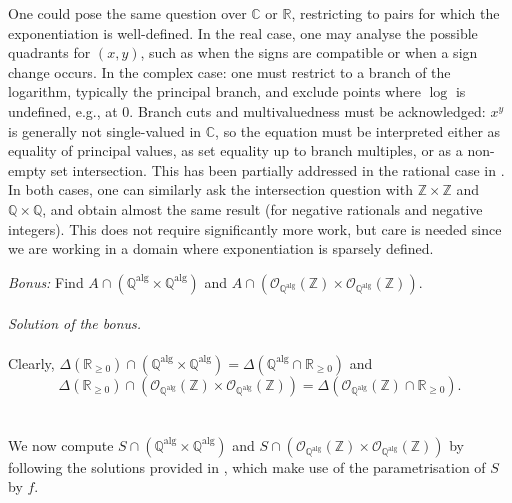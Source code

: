 \begin{solution}
    \begin{remark}
        One could pose the same question over \( \mathbb{C} \) or \( \mathbb{R} \), restricting to pairs for which the exponentiation is well-defined. In the real case, one may analyse the possible quadrants for \( \left(x,y\right) \), such as when the signs are compatible or when a sign change occurs. In the complex case: one must restrict to a branch of the logarithm, typically the principal branch, and exclude points where \( \log \) is undefined, e.g., at \( 0 \). Branch cuts and multivaluedness must be acknowledged: \( x^y \) is generally not single-valued in \( \mathbb{C} \), so the equation must be interpreted either as equality of principal values, as set equality up to branch multiples, or as a non-empty set intersection. This has been partially addressed in the rational case in \cite{solomon1967Hurwitz}. In both cases, one can similarly ask the intersection question with \( \mathbb{Z} \times \mathbb{Z} \) and \( \mathbb{Q} \times \mathbb{Q} \), and obtain almost the same result (for negative rationals and negative integers). This does not require significantly more work, but care is needed since we are working in a domain where exponentiation is sparsely defined.
    \end{remark}
    \noindent\textit{Bonus:}
    Find \( A \cap \left( \mathbb{Q}^{\mathrm{alg}} \times \mathbb{Q}^{\mathrm{alg}} \right) \) and \( A \cap \left( \mathcal{O}_{\mathbb{Q}^{\mathrm{alg}}}\left(\mathbb{Z}\right) \times \mathcal{O}_{\mathbb{Q}^{\mathrm{alg}}}\left(\mathbb{Z}\right) \right) \).
    \\\\
    \textit{Solution of the bonus.}
    \\\\
    Clearly, \( \Delta\left( \mathbb{R}_{\geq 0} \right) \cap \left( \mathbb{Q}^{\mathrm{alg}} \times \mathbb{Q}^{\mathrm{alg}} \right) = \Delta\left( \mathbb{Q}^{\mathrm{alg}} \cap \mathbb{R}_{\geq 0} \right) \) and
    \[
        \Delta\left( \mathbb{R}_{\geq 0} \right) \cap \left( \mathcal{O}_{\mathbb{Q}^{\mathrm{alg}}}\left(\mathbb{Z}\right) \times \mathcal{O}_{\mathbb{Q}^{\mathrm{alg}}}\left(\mathbb{Z}\right) \right) = \Delta\left( \mathcal{O}_{\mathbb{Q}^{\mathrm{alg}}}\left(\mathbb{Z}\right) \cap \mathbb{R}_{\geq 0} \right).
    \]
    \\\\
    We now compute \( S \cap \left( \mathbb{Q}^{\mathrm{alg}} \times \mathbb{Q}^{\mathrm{alg}} \right) \) and \( S \cap \left( \mathcal{O}_{\mathbb{Q}^{\mathrm{alg}}}\left(\mathbb{Z}\right) \times \mathcal{O}_{\mathbb{Q}^{\mathrm{alg}}}\left(\mathbb{Z}\right) \right) \) by following the solutions provided in \cite{sato1972algebraic}, which make use of the parametrisation of \( S \) by \( f \).

\end{solution}
